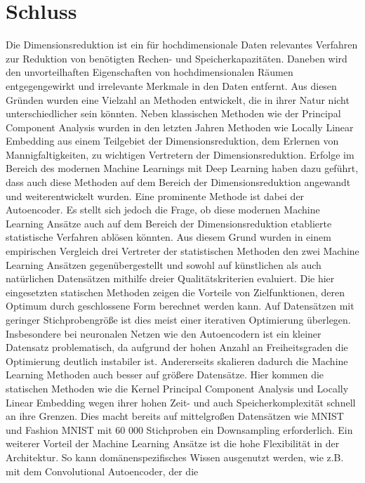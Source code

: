 \chapter{Schluss}
\label{ch:Schluss}

Die Dimensionsreduktion ist ein für hochdimensionale Daten relevantes Verfahren zur Reduktion von
benötigten Rechen- und Speicherkapazitäten. Daneben wird den unvorteilhaften Eigenschaften von
hochdimensionalen Räumen entgegengewirkt und irrelevante Merkmale in den Daten entfernt. Aus diesen
Gründen wurden eine Vielzahl an Methoden entwickelt, die in ihrer Natur nicht unterschiedlicher
sein könnten. Neben klassischen Methoden wie der Principal Component Analysis wurden in den letzten
Jahren Methoden wie Locally Linear Embedding aus einem Teilgebiet der Dimensionsreduktion, dem
Erlernen von Mannigfaltigkeiten, zu wichtigen Vertretern der Dimensionsreduktion. Erfolge im
Bereich des modernen Machine Learnings mit Deep Learning haben dazu geführt, dass auch diese
Methoden auf dem Bereich der Dimensionsreduktion angewandt und weiterentwickelt wurden. Eine
prominente Methode ist dabei der Autoencoder. Es stellt sich jedoch die Frage, ob diese modernen
Machine Learning Ansätze auch auf dem Bereich der Dimensionsreduktion etablierte statistische
Verfahren ablösen könnten. Aus diesem Grund wurden in einem empirischen Vergleich drei Vertreter
der statistischen Methoden den zwei Machine Learning Ansätzen gegenübergestellt und sowohl auf
künstlichen als auch natürlichen Datensätzen mithilfe dreier Qualitätskriterien evaluiert. Die hier
eingesetzten statischen Methoden zeigen die Vorteile von Zielfunktionen, deren Optimum durch
geschlossene Form berechnet werden kann. Auf Datensätzen mit geringer Stichprobengröße ist dies
meist einer iterativen Optimierung überlegen. Insbesondere bei neuronalen Netzen wie den
Autoencodern ist ein kleiner Datensatz problematisch, da aufgrund der hohen Anzahl an
Freiheitsgraden die Optimierung deutlich instabiler ist. Andererseits skalieren dadurch die Machine
Learning Methoden auch besser auf größere Datensätze. Hier kommen die statischen Methoden wie die
Kernel Principal Component Analysis und Locally Linear Embedding wegen ihrer hohen Zeit- und auch
Speicherkomplexität schnell an ihre Grenzen. Dies macht bereits auf mittelgroßen Datensätzen wie
MNIST und Fashion MNIST mit 60 000 Stichproben ein Downsampling erforderlich. Ein weiterer Vorteil
der Machine Learning Ansätze ist die hohe Flexibilität in der Architektur. So kann
domänenspezifisches Wissen ausgenutzt werden, wie z.B. mit dem Convolutional Autoencoder, der die
